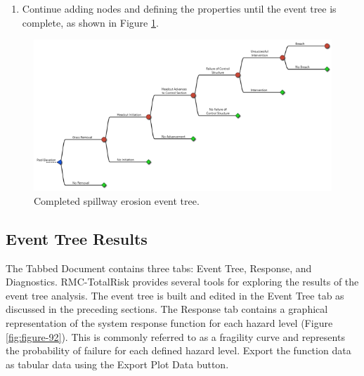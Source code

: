\documentclass[
]{book}
\providecommand{\tightlist}{%
  \setlength{\itemsep}{0pt}\setlength{\parskip}{0pt}}
\begin{document}
\begin{enumerate}
\def\labelenumi{\arabic{enumi}.}
\setcounter{enumi}{4}
\tightlist
\item
  Continue adding nodes and defining the properties until the event tree is complete, as shown in Figure \ref{fig:figure-91}.
\end{enumerate}

\begin{figure}

{\centering \includegraphics{images/figure91} 

}

\caption{Completed spillway erosion event tree.}\label{fig:figure-91}
\end{figure}

\hypertarget{event-tree-results}{%
\subsection{Event Tree Results}\label{event-tree-results}}

The Tabbed Document contains three tabs: Event Tree, Response, and Diagnostics. RMC-TotalRisk provides several tools for exploring the results of the event tree analysis.
The event tree is built and edited in the Event Tree tab as discussed in the preceding sections. The Response tab contains a graphical representation of the system response function for each hazard level (Figure \ref{fig:figure-92}). This is commonly referred to as a fragility curve and represents the probability of failure for each defined hazard level. Export the function data as tabular data using the Export Plot Data button.
\end{document}
